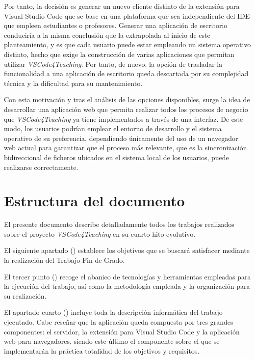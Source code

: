 Por tanto, la decisión es generar un nuevo cliente distinto de la extensión para Visual Studio Code que se base en una plataforma que sea independiente del IDE que empleen estudiantes o profesores. Generar una aplicación de escritorio conduciría a la misma conclusión que la extrapolada al inicio de este planteamiento, y es que cada usuario puede estar empleando un sistema operativo distinto, hecho que exige la construcción de varias aplicaciones que permitan utilizar \textit{VSCode4Teaching}. Por tanto, de nuevo, la opción de trasladar la funcionalidad a una aplicación de escritorio queda descartada por su complejidad técnica y la dificultad para su mantenimiento.

Con esta motivación y tras el análisis de las opciones disponibles, surge la idea de desarrollar una aplicación web que permita realizar todos los procesos de negocio que \textit{VSCode4Teaching} ya tiene implementados a través de una interfaz. De este modo, los usuarios podrían emplear el entorno de desarrollo y el sistema operativo de su preferencia, dependiendo únicamente del uso de un navegador web actual para garantizar que el proceso más relevante, que es la sincronización bidireccional de ficheros ubicados en el sistema local de los usuarios, puede realizarse correctamente.

\section{Estructura del documento}
\label{sec:estructura}
El presente documento describe detalladamente todos los trabajos realizados sobre el proyecto \textit{VSCode4Teaching} en su cuarto hito evolutivo.

El siguiente apartado () establece los objetivos que se buscará satisfacer mediante la realización del Trabajo Fin de Grado.

El tercer punto () recoge el abanico de tecnologías y herramientas empleadas para la ejecución del trabajo, así como la metodología empleada y la organización para su realización.

El apartado cuarto () incluye toda la descripción informática del trabajo ejecutado. Cabe reseñar que la aplicación queda compuesta por tres grandes componentes: el servidor, la extensión para Visual Studio Code y la aplicación web para navegadores, siendo este último el componente sobre el que se implementarán la práctica totalidad de los objetivos y requisitos.

